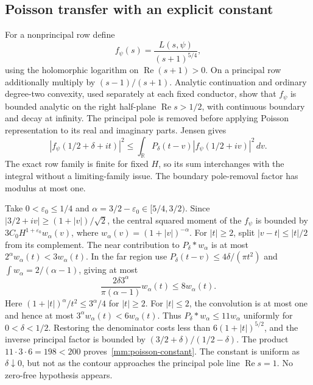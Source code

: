 \subsection{Poisson transfer with an explicit constant}
For a nonprincipal row define
\[
 f_\psi(s)=\frac{L(s,\psi)}{(s+1)^{5/4}},
\]
using the holomorphic logarithm on $\operatorname{Re}(s+1)>0$.
On a principal row additionally multiply by $(s-1)/(s+1)$.
Analytic continuation and ordinary degree-two convexity, used separately
at each fixed conductor, show that $f_\psi$ is bounded analytic on the
right half-plane $\operatorname{Re}s>1/2$, with continuous boundary
and decay at infinity. The principal pole is removed before applying
Poisson representation to its real and imaginary parts. Jensen gives
\[
 |f_\psi(1/2+\delta+it)|^2
 \le\int_{\mathbb R}P_\delta(t-v)
             |f_\psi(1/2+iv)|^2\,dv.
\]
The exact row family is finite for fixed $H$, so its sum interchanges
with the integral without a limiting-family issue. The boundary
pole-removal factor has modulus at most one.

Take $0<\varepsilon_0\le1/4$ and
$\alpha=3/2-\varepsilon_0\in[5/4,3/2)$. Since
$|3/2+iv|\ge(1+|v|)/\sqrt2$, the central squared moment of the
$f_\psi$ is bounded by
$3C_0H^{1+\varepsilon_0}w_\alpha(v)$, where
$w_\alpha(v)=(1+|v|)^{-\alpha}$.
For $|t|\ge2$, split $|v-t|\le|t|/2$ from its complement. The
near contribution to $P_\delta*w_\alpha$ is at most
$2^\alpha w_\alpha(t)<3w_\alpha(t)$. In the far region use
$P_\delta(t-v)\le4\delta/(\pi t^2)$ and
$\int w_\alpha=2/(\alpha-1)$, giving at most
\[
 \frac{2\delta3^\alpha}{\pi(\alpha-1)}w_\alpha(t)
 \le8w_\alpha(t).
\]
Here $(1+|t|)^\alpha/t^2\le3^\alpha/4$ for $|t|\ge2$.
For $|t|\le2$, the convolution is at most one and hence at most
$3^\alpha w_\alpha(t)<6w_\alpha(t)$. Thus
$P_\delta*w_\alpha\le11w_\alpha$ uniformly for $0<\delta<1/2$.
Restoring the denominator costs less than
$6(1+|t|)^{5/2}$, and the inverse principal factor is bounded by
$(3/2+\delta)/(1/2-\delta)$. The product $11\cdot3\cdot6=198<200$
proves~\eqref{mm:poisson-constant}. The constant is uniform as
$\delta\downarrow0$, but not as the contour approaches the principal
pole line $\operatorname{Re}s=1$. No zero-free hypothesis appears.

